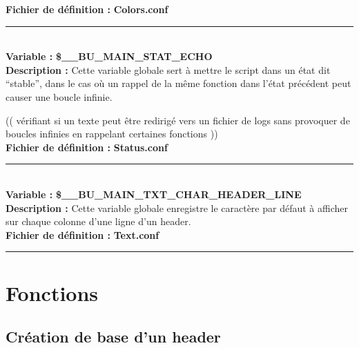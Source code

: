 \documentclass[a4paper,10pt]{article}
\begin{document}
\textbf{Fichier de définition :} \textbf{\color{lime}Colors.conf\color{white}}\\[1\baselineskip]



\color{orange}\par\noindent\rule{\textwidth}{0.4pt}\color{white}\\[1\baselineskip]
\textbf{Variable :} \textbf{\color{orange}\$\_\_BU\_MAIN\_STAT\_ECHO\color{white}}\\[1\baselineskip]

\textbf{Description :} Cette variable globale sert à mettre le script dans un état dit ``stable'', dans le cas où un rappel de la même fonction dans l'état précédent peut causer une boucle infinie.


(( vérifiant si un texte peut être redirigé vers un fichier de logs sans provoquer de boucles infinies en\linebreak
rappelant certaines fonctions ))
\\[1\baselineskip]

\textbf{Fichier de définition :} \textbf{\color{lime}Status.conf\color{white}}\\[1\baselineskip]



\color{orange}\par\noindent\rule{\textwidth}{0.4pt}\color{white}\\[1\baselineskip]

\textbf{Variable :} \textbf{\color{orange}\$\_\_BU\_MAIN\_TXT\_CHAR\_HEADER\_LINE\color{white}}\\[1\baselineskip]

\textbf{Description :} Cette variable globale enregistre le caractère par défaut à afficher sur chaque colonne d'une ligne d'un header.\\[1\baselineskip]

\textbf{Fichier de définition :} \textbf{\color{lime}Text.conf\color{white}}\\[1\baselineskip]



\color{red}\par\noindent\rule{\textwidth}{0.4pt}\color{white}

\color{red}
\section{Fonctions}\color{white}

\color{green}
\subsection{Création de base d'un header}\color{white}
\end{document}
